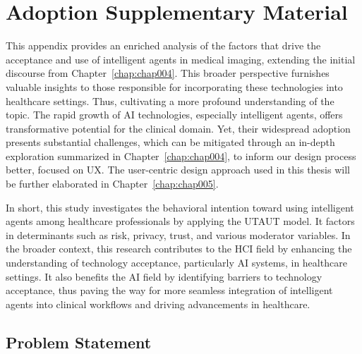 \chapter{Adoption Supplementary Material}
\label{chap:app002}

This appendix provides an enriched analysis of the factors that drive the acceptance and use of intelligent agents in medical imaging, extending the initial discourse from Chapter~\ref{chap:chap004}.
This broader perspective furnishes valuable insights to those responsible for incorporating these technologies into healthcare settings.
Thus, cultivating a more profound understanding of the topic.
The rapid growth of \ac{AI} technologies, especially intelligent agents, offers transformative potential for the clinical domain.
Yet, their widespread adoption presents substantial challenges, which can be mitigated through an in-depth exploration summarized in Chapter~\ref{chap:chap004}, to inform our design process better, focused on \ac{UX}.
The user-centric design approach used in this thesis will be further elaborated in Chapter~\ref{chap:chap005}.

In short, this study investigates the behavioral intention toward using intelligent agents among healthcare professionals by applying the \ac{UTAUT} model.
It factors in determinants such as risk, privacy, trust, and various moderator variables. In the broader context, this research contributes to the \ac{HCI} field by enhancing the understanding of technology acceptance, particularly \ac{AI} systems, in healthcare settings.
It also benefits the \ac{AI} field by identifying barriers to technology acceptance, thus paving the way for more seamless integration of intelligent agents into clinical workflows and driving advancements in healthcare.

\section{Problem Statement}
\label{chap:app002001}

